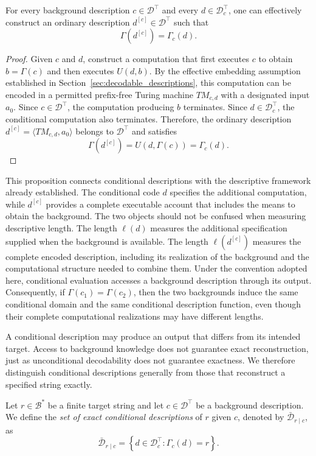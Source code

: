 \begin{proposition}
\label{prop:conditional_description_realization}
For every background description $c\in\mathcal{D}^\top$ and every $d\in\mathcal{D}_c^\top$, one can effectively construct an ordinary description $d^{[c]}\in\mathcal{D}^\top$ such that
\[
\Gamma(d^{[c]})=\Gamma_c(d).
\]
\end{proposition}
\begin{proof}
Given $c$ and $d$, construct a computation that first executes $c$ to obtain $b=\Gamma(c)$ and then executes $U(d,b)$. By the effective embedding assumption established in Section~\ref{sec:decodable_descriptions}, this computation can be encoded in a permitted prefix-free Turing machine $TM_{c,d}$ with a designated input $a_0$. Since $c\in\mathcal{D}^\top$, the computation producing $b$ terminates. Since $d\in\mathcal{D}_c^\top$, the conditional computation also terminates. Therefore, the ordinary description $d^{[c]}=\langle TM_{c,d},a_0\rangle$ belongs to $\mathcal{D}^\top$ and satisfies
\[
\Gamma(d^{[c]}) = U(d,\Gamma(c)) = \Gamma_c(d).
\]
\end{proof}

This proposition connects conditional descriptions with the descriptive framework already established. The conditional code $d$ specifies the additional computation, while $d^{[c]}$ provides a complete executable account that includes the means to obtain the background. The two objects should not be confused when measuring descriptive length. The length $\ell(d)$ measures the additional specification supplied when the background is available. The length $\ell(d^{[c]})$ measures the complete encoded description, including its realization of the background and the computational structure needed to combine them. Under the convention adopted here, conditional evaluation accesses a background description through its output. Consequently, if $\Gamma(c_1)=\Gamma(c_2)$, then the two backgrounds induce the same conditional domain and the same conditional description function, even though their complete computational realizations may have different lengths.

A conditional description may produce an output that differs from its intended target. Access to background knowledge does not guarantee exact reconstruction, just as unconditional decodability does not guarantee exactness. We therefore distinguish conditional descriptions generally from those that reconstruct a specified string exactly.

\begin{definition}
\label{def:conditional_description}
Let $r\in\mathcal{B}^\ast$ be a finite target string and let $c\in\mathcal{D}^\top$ be a background description. We define the \emph{set of exact conditional descriptions} of $r$ given $c$, denoted by $\bar{\mathcal{D}}_{r\mid c}$, as
\[
\bar{\mathcal{D}}_{r\mid c} = \left\{d\in\mathcal{D}_c^\top:\Gamma_c(d)=r\right\}.
\]
\end{definition}

